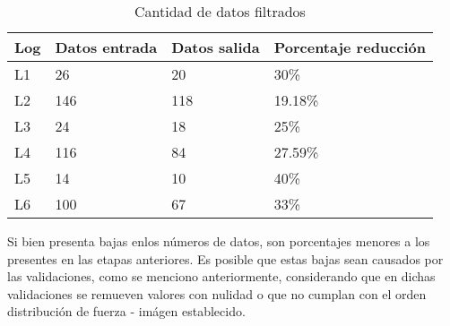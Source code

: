 \begin{table}[h]
    \centering
    \caption{\label{table:etapa3} Cantidad de datos filtrados}
    \begin{tabular}{|p{3.5cm}|p{3.5cm}|p{3.5cm}|p{3.5cm}|}
        \hline
        Log & Datos entrada & Datos salida & Porcentaje reducción \\
        \hline
        L1 & 26 & 20 & 30\% \\
        \hline
        L2 & 146 & 118 & 19.18\% \\
        \hline
        L3 & 24 & 18 & 25\% \\
        \hline        
        L4 & 116 & 84 & 27.59\% \\
        \hline
        L5 & 14 & 10 & 40\% \\
        \hline
        L6 & 100 & 67 & 33\% \\
    \end{tabular}
\end{table}

Si bien presenta bajas enlos números de datos, son porcentajes menores a los presentes en las etapas anteriores. Es posible que estas bajas sean causados por las validaciones, como se menciono anteriormente, considerando que en dichas validaciones se remueven valores con nulidad o que no cumplan con el orden distribución de fuerza - imágen establecido.